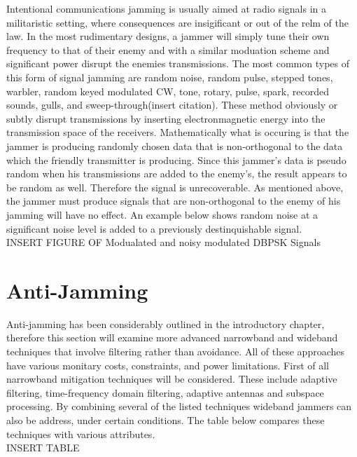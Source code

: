 \documentclass[11pt]{mvlthesis}
\begin{document}
Intentional communications jamming is usually aimed at radio signals in a militaristic setting, where consequences are insigificant or out of the relm of the law. In the most rudimentary designs, a jammer will simply tune their own frequency to that of their enemy and with a similar moduation scheme and significant power disrupt the enemies transmissions.  The most common types of this form of signal jamming are random noise, random pulse, stepped tones, warbler, random keyed modulated CW, tone, rotary, pulse, spark, recorded sounds, gulls, and sweep-through(insert citation).  These method obviously or subtly disrupt transmissions by inserting electronmagnetic energy into the transmission space of the receivers.  Mathematically what is occuring is that the jammer is producing randomly chosen data that is non-orthogonal to the data which the friendly transmitter is producing.  Since this jammer's data is pseudo random when his transmissions are added to the enemy's, the result appears to be random as well.  Therefore the signal is unrecoverable.  As mentioned above, the jammer must produce signals that are non-orthogonal to the enemy of his jamming will have no effect.  An example below shows random noise at a significant noise level is added to a previously destinquishable signal.\\

INSERT FIGURE OF Modualated and noisy modulated DBPSK Signals\\

\section{Anti-Jamming}

Anti-jamming has been considerably outlined in the introductory chapter, therefore this section will examine more advanced narrowband and wideband techniques that involve filtering rather than avoidance.  All of these approaches have various monitary costs, constraints, and power limitations.  First of all narrowband mitigation techniques will be considered.  These include adaptive filtering, time-frequency domain filtering, adaptive antennas and subspace processing.  By combining several of the listed techniques wideband jammers can also be address, under certain conditions.  The table below compares these techniques with various attributes.\\

INSERT TABLE\\
\end{document}
